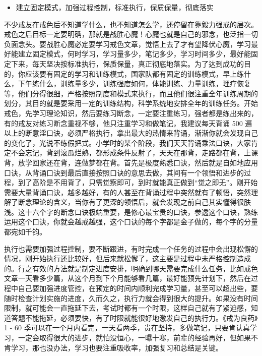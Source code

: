 \begin{itemize}
    \item 建立固定模式，加强过程控制，标准执行，保质保量，彻底落实
\end{itemize}

不少戒友在戒色后不知道学什么，也不知道怎么学，还停留在靠毅力强戒的层次。戒色之后目标一定要明确，那就是战胜心魔！心魔也就是自己的邪念，也泛指一切负面念头。要战胜心魔必定要学习戒色文章，觉悟上去了才有望降伏心魔，学习最好能建立固定模式，何时学习，学习量多少，笔记多少，学习时间多少，最好能固定下来，每天坚决按标准执行，保质保量，真正彻底地落实。为了达到成功的目的，你应该要有固定的学习和训练模式，国家队都有固定的训练模式，早上练什么，下午练什么，训练量多少，训练强度如何，体能训练、力量训练，理疗恢复等，他们分得很细，严格按照制度和模式来执行，而且他们很注重全年训练周期的划分，其目的就是要采用一定的训练结构，科学系统地安排全年的训练任务。开始戒色，先学习理论知识，然后要练习断念，一定要注重练习，强者都是练出来的，有的戒友对练习断念重视不够，他只注重学习和做笔记，我建议每天背诵 500 遍以上的断意淫口诀，必须严格执行，拿出最大的热情来背诵，渐渐你就会发现自己的变化了，光说不练假把式。小学时的某个阶段，我们天天背诵乘法口诀，大家肯定不会忘记，背到滚瓜烂熟，都形成条件反射了，天天在那背，走路都在背，上课背，放学回家还在背，连做梦都在背。首先是极度熟悉口诀，然后就是自如地应用口诀，从背诵口诀到最后直接按照口诀的意思去做，其间有一个领悟和进步的过程，到了高阶是不用背了，只需觉察即可，到时就能真正做到“觉之即无”。刚开始需要大量背诵口诀，越多越好，有的人甚至在背诵过程中突然就有了顿悟，突然理解了断念理论的含义，当你有了更深的领悟后，就会发现之前自己其实懂得很肤浅。这十六个字的断念口诀极端重要，是修心最宝贵的口诀，参透这个口诀，熟练运用这个口诀，你就会越戒越强，这个口诀的每个字都是金子做的，每个字的分量都宛如千钧。

执行也需要加强过程控制，要不断跟进，有时完成一个任务的过程中会出现松懈的情况，刚开始执行还比较好，但后来就松懈了，这主要是过程中未严格控制造成的。行之有效的方法就是制定进度安排，明确到哪天需要完成什么任务，比如戒色文章一天看多少篇，从这个月到下个月能够看几篇，最好能预先计划下，然后在过程中自己要加强进度管控，在预定的时间内顺利完成学习量，甚至可以超出些，要随时检查计划实施的进度，久而久之，执行力就会得到很大的提升。如果没有时间限制，就可能会一直拖延下去，考试时都有一个时限，这样自己就有了紧迫感，知道答题不能拖延，必须要快，有了时限就能很好地激发自己的执行力。《戒为良药》1 - 60 季可以在一个月内看完，一天看两季，贵在坚持，多做笔记，只要肯认真学习，一定会取得很大的进步，就怕没恒心，一曝十寒，前辈的经验再好，但如果不肯学习，那也没办法，学习也要注重吸收率，加强复习和总结是关键。

